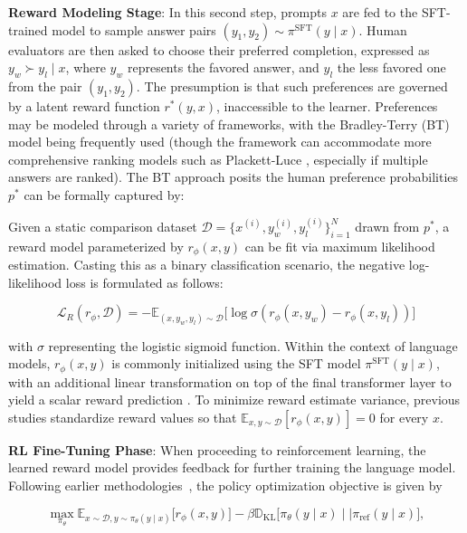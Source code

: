 \textbf{Reward Modeling Stage}: In this second step, prompts $x$ are fed to the SFT-trained model to sample answer pairs $(y_1, y_2)\sim \pi^\text{SFT}(y \mid x)$. Human evaluators are then asked to choose their preferred completion, expressed as $y_w\succ y_l \mid x$, where $y_w$ represents the favored answer, and $y_l$ the less favored one from the pair $(y_1, y_2)$. The presumption is that such preferences are governed by a latent reward function $r^*(y, x)$, inaccessible to the learner. Preferences may be modeled through a variety of frameworks, with the Bradley-Terry (BT) model \cite{bradley1952rankanalysis} being frequently used (though the framework can accommodate more comprehensive ranking models such as Plackett-Luce \citep{plackett1975analysis, luce2012individual}, especially if multiple answers are ranked). The BT approach posits the human preference probabilities $p^*$ can be formally captured by:

Given a static comparison dataset $\mathcal{D} = \bigl\{x^{(i)}, y_w^{(i)}, y_l^{(i)}\bigr\}_{i=1}^N$ drawn from $p^*$, a reward model parameterized by $r_\phi(x, y)$ can be fit via maximum likelihood estimation. Casting this as a binary classification scenario, the negative log-likelihood loss is formulated as follows:

\begin{equation}\label{eq:reward_model}
    \mathcal{L}_R(r_{\phi}, \mathcal{D}) = -\mathbb{E}_{(x, y_w, y_l)\sim \mathcal{D}}\bigl[\log \sigma(r_{\phi}(x, y_w)- r_{\phi}(x, y_l))\bigr]
\end{equation}

with $\sigma$ representing the logistic sigmoid function. Within the context of language models, $r_\phi(x, y)$ is commonly initialized using the SFT model $\pi^\text{SFT}(y \mid x)$, with an additional linear transformation on top of the final transformer layer to yield a scalar reward prediction \cite{ziegler2020finetuning}. To minimize reward estimate variance, previous studies standardize reward values so that $\mathbb{E}_{x,y\sim \mathcal{D}}\left[r_\phi(x, y)\right] = 0$ for every $x$.

\textbf{RL Fine-Tuning Phase}: When proceeding to reinforcement learning, the learned reward model provides feedback for further training the language model. Following earlier methodologies~\citep{jaques2017sequence, jaques2020human}, the policy optimization objective is given by

\begin{equation}\label{eq:RL}
\max_{\pi_{\theta}}  \mathbb{E}_{x\sim \mathcal{D}, y\sim \pi_{\theta}(y \mid x)}\bigl[r_{\phi}(x, y)\bigr] - \beta\mathbb{D}_{\textrm{KL}}\bigl[\pi_{\theta}(y\mid x)\mid \mid \pi_\text{ref}(y\mid x)\bigr],
\end{equation}

